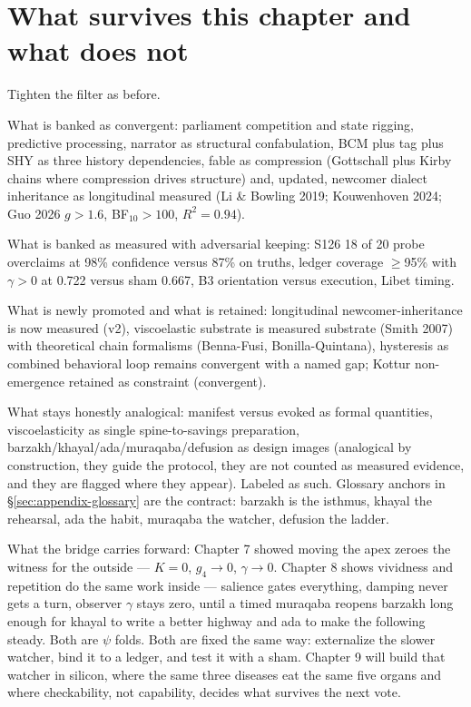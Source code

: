 \section{What survives this chapter and what does not}

Tighten the filter as before.

What is banked as convergent: parliament competition and state rigging, predictive processing, narrator as structural confabulation, BCM plus tag plus SHY as three history dependencies, fable as compression (Gottschall plus Kirby chains where compression drives structure) and, updated, newcomer dialect inheritance as longitudinal measured (Li \& Bowling 2019; Kouwenhoven 2024; Guo 2026 $g>1.6$, BF$_{10}>100$, $R^2=0.94$).

What is banked as measured with adversarial keeping: S126 18 of 20 probe overclaims at 98\% confidence versus 87\% on truths, ledger coverage $\geq$95\% with $\gamma > 0$ at 0.722 versus sham 0.667, B3 orientation versus execution, Libet timing.

What is newly promoted and what is retained: longitudinal newcomer-inheritance is now measured (v2), viscoelastic substrate is measured substrate (Smith 2007) with theoretical chain formalisms (Benna-Fusi, Bonilla-Quintana), hysteresis as combined behavioral loop remains convergent with a named gap; Kottur non-emergence retained as constraint (convergent).

What stays honestly analogical: manifest versus evoked as formal quantities, viscoelasticity as single spine-to-savings preparation, barzakh/khayal/ada/muraqaba/defusion as design images (analogical by construction, they guide the protocol, they are not counted as measured evidence, and they are flagged where they appear). Labeled as such. Glossary anchors in \S\ref{sec:appendix-glossary} are the contract: barzakh is the isthmus, khayal the rehearsal, ada the habit, muraqaba the watcher, defusion the ladder.

What the bridge carries forward: Chapter 7 showed moving the apex zeroes the witness for the outside --- $K=0$, $g_4\to0$, $\gamma\to0$. Chapter 8 shows vividness and repetition do the same work inside --- salience gates everything, damping never gets a turn, observer $\gamma$ stays zero, until a timed muraqaba reopens barzakh long enough for khayal to write a better highway and ada to make the following steady. Both are $\psi$ folds. Both are fixed the same way: externalize the slower watcher, bind it to a ledger, and test it with a sham. Chapter 9 will build that watcher in silicon, where the same three diseases eat the same five organs and where checkability, not capability, decides what survives the next vote.
